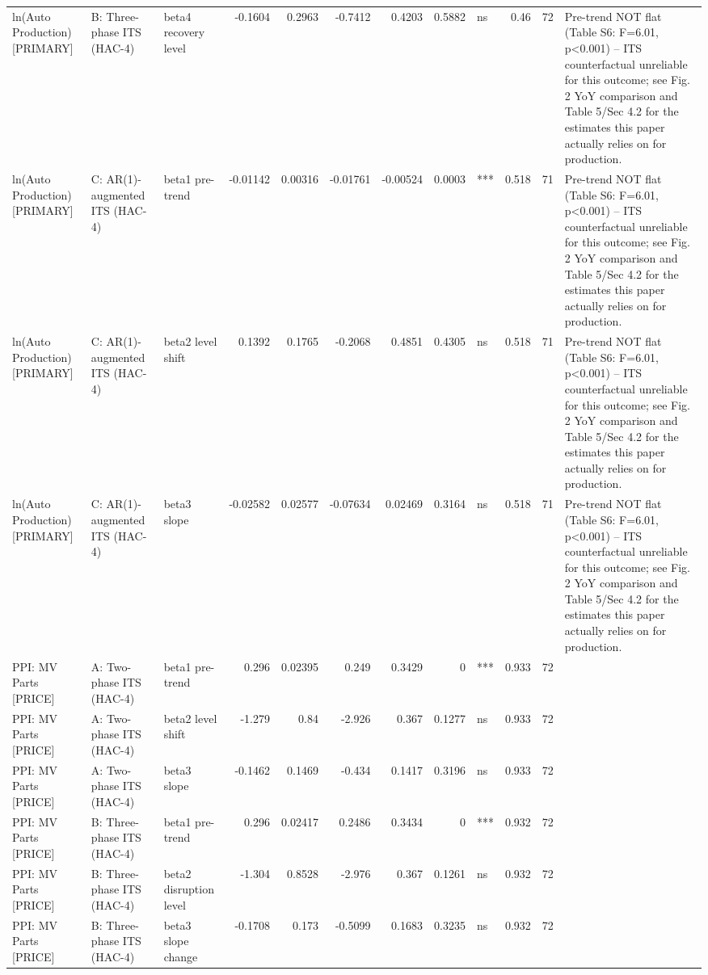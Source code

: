 \begin{table}
\begin{tabular}{lllrrrrrlrrl}
ln(Auto Production) [PRIMARY] & B: Three-phase ITS (HAC-4) & beta4 recovery level & -0.1604 & 0.2963 & -0.7412 & 0.4203 & 0.5882 & ns & 0.46 & 72 & Pre-trend NOT flat (Table S6: F=6.01, p<0.001) -- ITS counterfactual unreliable for this outcome; see Fig. 2 YoY comparison and Table 5/Sec 4.2 for the estimates this paper actually relies on for production. \\
ln(Auto Production) [PRIMARY] & C: AR(1)-augmented ITS (HAC-4) & beta1 pre-trend & -0.01142 & 0.00316 & -0.01761 & -0.00524 & 0.0003 & *** & 0.518 & 71 & Pre-trend NOT flat (Table S6: F=6.01, p<0.001) -- ITS counterfactual unreliable for this outcome; see Fig. 2 YoY comparison and Table 5/Sec 4.2 for the estimates this paper actually relies on for production. \\
ln(Auto Production) [PRIMARY] & C: AR(1)-augmented ITS (HAC-4) & beta2 level shift & 0.1392 & 0.1765 & -0.2068 & 0.4851 & 0.4305 & ns & 0.518 & 71 & Pre-trend NOT flat (Table S6: F=6.01, p<0.001) -- ITS counterfactual unreliable for this outcome; see Fig. 2 YoY comparison and Table 5/Sec 4.2 for the estimates this paper actually relies on for production. \\
ln(Auto Production) [PRIMARY] & C: AR(1)-augmented ITS (HAC-4) & beta3 slope & -0.02582 & 0.02577 & -0.07634 & 0.02469 & 0.3164 & ns & 0.518 & 71 & Pre-trend NOT flat (Table S6: F=6.01, p<0.001) -- ITS counterfactual unreliable for this outcome; see Fig. 2 YoY comparison and Table 5/Sec 4.2 for the estimates this paper actually relies on for production. \\
PPI: MV Parts [PRICE] & A: Two-phase ITS (HAC-4) & beta1 pre-trend & 0.296 & 0.02395 & 0.249 & 0.3429 & 0 & *** & 0.933 & 72 &  \\
PPI: MV Parts [PRICE] & A: Two-phase ITS (HAC-4) & beta2 level shift & -1.279 & 0.84 & -2.926 & 0.367 & 0.1277 & ns & 0.933 & 72 &  \\
PPI: MV Parts [PRICE] & A: Two-phase ITS (HAC-4) & beta3 slope & -0.1462 & 0.1469 & -0.434 & 0.1417 & 0.3196 & ns & 0.933 & 72 &  \\
PPI: MV Parts [PRICE] & B: Three-phase ITS (HAC-4) & beta1 pre-trend & 0.296 & 0.02417 & 0.2486 & 0.3434 & 0 & *** & 0.932 & 72 &  \\
PPI: MV Parts [PRICE] & B: Three-phase ITS (HAC-4) & beta2 disruption level & -1.304 & 0.8528 & -2.976 & 0.367 & 0.1261 & ns & 0.932 & 72 &  \\
PPI: MV Parts [PRICE] & B: Three-phase ITS (HAC-4) & beta3 slope change & -0.1708 & 0.173 & -0.5099 & 0.1683 & 0.3235 & ns & 0.932 & 72 &  \\

\end{tabular}
\end{table}
